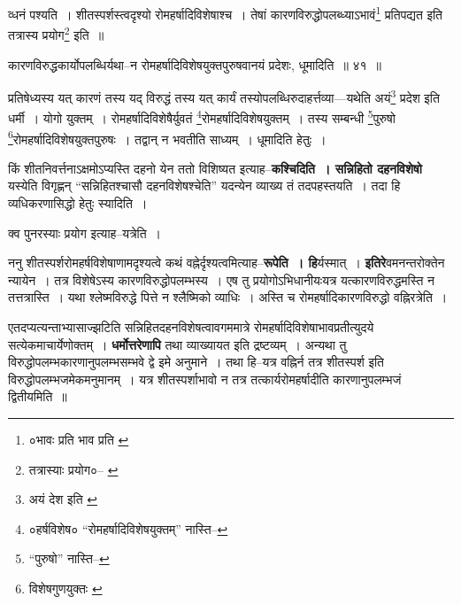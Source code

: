 \documentclass[article,12pt,a4paper]{memoir}
\begin{document}
	  \pstart व्धनं पश्यति । शीतस्पर्शस्त्वदृश्यो रोमहर्षादिविशेषाश्च । तेषां कारणविरुद्धोपलब्ध्याऽभावं\footnote{०भावः प्रति \cite{dp-edP} \cite{dp-edH} \cite{dp-edE} \cite{dp-edN} भाव प्रति \cite{dp-msA}} प्रतिपद्यत इति तत्रास्य प्रयोग\footnote{तत्रास्याः प्रयोग०--\cite{dp-msA} \cite{dp-msB} \cite{dp-msC} \cite{dp-msD} \cite{dp-edP} \cite{dp-edH} \cite{dp-edE} \cite{dp-edN}} इति ॥
	\pend
       
	  \bigskip
	  \begingroup
	

	  \pstart कारणविरुद्धकार्योपलब्धिर्यथा--न रोमहर्षादिविशेषयुक्तपुरुषवानयं प्रदेशः, धूमादिति ॥ ४१ ॥
	\pend
      
	  \endgroup
	 

	  \pstart प्रतिषेध्यस्य यत् कारणं तस्य यद् विरुद्धं तस्य यत् कार्यं तस्योपलब्धिरुदाहर्त्तव्या—यथेति अयं\footnote{अयं देश इति \cite{dp-msA} \cite{dp-edP} \cite{dp-edH} \cite{dp-edE} \cite{dp-edN}} प्रदेश इति धर्मी । योगो युक्तम् । रोमहर्षादिविशेषैर्युवतं \footnote{०हर्षविशेष० \cite{dp-msC} “रोमहर्षादिविशेषयुक्तम्” नास्ति--\cite{dp-msB}}\-रोमहर्षादिविशेषयुक्तम् । तस्य सम्बन्धी \footnote{“पुरुषो” नास्ति--\cite{dp-msC}}\-पुरुषो \footnote{विशेषगुणयुक्तः \cite{dp-msB}}\-रोमहर्षादिविशेषयुक्तपुरुषः । तद्वान् न भवतीति साध्यम् । धूमादिति हेतुः ।
	\pend
      
	  \endgroup
	

	  \pstart किं \leavevmode{} शीतनिवर्त्तनाऽक्षमोऽप्यस्ति दहनो येन ततो विशिष्यत इत्याह--\textbf{कश्चिदिति । सन्निहितो दहनविशेषो} यस्येति विगृह्णन् “सन्निहितश्चासौ दहनविशेषश्चेति” यदन्येन व्याख्य तं तदपहस्तयति । तदा हि व्यधिकरणासिद्धो हेतुः स्यादिति ।
	\pend
      

	  \pstart क्व पुनरस्याः प्रयोग इत्याह--यत्रेति ।
	\pend
      

	  \pstart ननु शीतस्पर्शरोमहर्षविशेषाणामदृश्यत्वे कथं वह्नेर्दृश्यत्वमित्याह--\textbf{रूपेति । हि}र्यस्मात् । \textbf{इतिरे}वमनन्तरोक्तेन न्यायेन । तत्र विशेषेऽस्य कारणविरुद्धोपलम्भस्य । एष तु प्रयोगोऽभिधानीयःयत्र यत्कारणविरुद्धमस्ति न तत्तत्रास्ति । यथा श्लेष्मविरुद्धे पित्ते न श्लैष्मिको व्याधिः । अस्ति च रोमहर्षादिकारणविरुद्धो वह्निरत्रेति ।
	\pend
      

	  \pstart एतदप्यत्यन्ताभ्यासाज्झटिति सन्निहितदहनविशेषत्वावगममात्रे रोमहर्षादिविशेषाभावप्रतीत्युदये सत्येकमाचार्येणोक्तम् । \textbf{धर्मोत्तरेणापि} तथा व्याख्यायत इति द्रष्टव्यम् । अन्यथा तु विरुद्धोपलम्भकारणानुपलम्भसम्भवे द्वे इमे अनुमाने । तथा हि--यत्र वह्निर्न तत्र शीतस्पर्श इति विरुद्धोपलम्भजमेकमनुमानम् । यत्र शीतस्पर्शाभावो न तत्र तत्कार्यरोमहर्षादीति कारणानुपलम्भजं द्वितीयमिति ॥
	\pend
      
\end{document}
